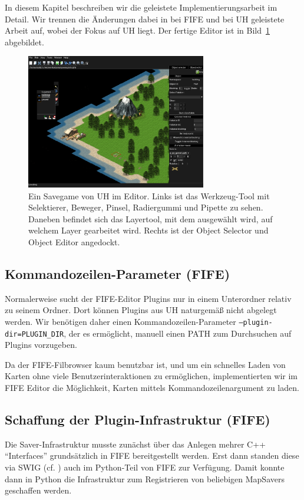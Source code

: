In diesem Kapitel beschreiben wir die geleistete Implementierungsarbeit im
Detail. Wir trennen die Änderungen dabei in bei FIFE und bei UH geleistete
Arbeit auf, wobei der Fokus auf UH liegt. Der fertige Editor ist in
Bild~\ref{figure:editor} abgebildet.

%
%
\begin{figure}[htbp]
  \centering

    \includegraphics[width=0.7\textwidth]{gfx/editor_screenshot.png}

  \caption{Ein Savegame von UH im Editor. Links ist das Werkzeug-Tool mit
  Selektierer, Beweger, Pinsel, Radiergummi und Pipette zu sehen. Daneben
  befindet sich das Layertool, mit dem ausgewählt wird, auf welchem Layer
  gearbeitet wird. Rechts ist der Object Selector und Object Editor angedockt.}
  \label{figure:editor}
\end{figure}

\subsection{Kommandozeilen-Parameter (FIFE)}
Normalerweise sucht der FIFE-Editor Plugins nur in einem Unterordner relativ zu
seinem Ordner. Dort können Plugins aus UH naturgemäß nicht abgelegt werden. Wir
benötigen daher einen Kommandozeilen-Parameter {\tt --plugin-dir=PLUGIN\_DIR},
der es ermöglicht, manuell einen PATH zum Durchsuchen auf Plugins vorzugeben. 

Da der FIFE-Filbrowser kaum benutzbar ist, und um ein schnelles Laden von Karten
ohne viele Benutzerinteraktionen zu ermöglichen, implementierten wir im FIFE
Editor die Möglichkeit, Karten mittels Kommandozeilenargument zu laden. 



\subsection{Schaffung der Plugin-Infrastruktur (FIFE)}
Die Saver-Infrastruktur musste zunächst über das Anlegen mehrer C++
``Interfaces'' grundsätzlich in FIFE bereitgestellt werden. Erst dann standen
diese via SWIG (cf.
\cite{swig}) auch im Python-Teil von FIFE zur Verfügung. Damit konnte dann in
Python die Infrastruktur zum Registrieren von beliebigen MapSavers geschaffen
werden.

